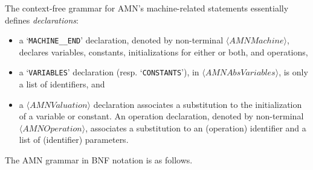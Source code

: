\documentclass[a4paper,openany]{book}
\newcommand{\BS}{\char`\\}
\begin{document}
The context-free grammar for AMN's machine-related statements
essentially defines \emph{declarations}:
\begin{itemize}
\item a `\texttt{MACHINE\_\_END}' declaration, denoted by non-terminal $\langle\mathit{AMNMachine}\rangle$, declares variables, constants, initializations for either or both, and operations,
\item a `\texttt{VARIABLES}' declaration (resp. `\texttt{CONSTANTS}'), in $\langle\mathit{AMNAbsVariables}\rangle$, is only a list of identifiers, and
\item a  $\langle\mathit{AMNValuation}\rangle$ declaration associates a substitution to the initialization of a variable or constant. An operation declaration, denoted by non-terminal $\langle\mathit{AMNOperation}\rangle$, associates a substitution to an (operation) identifier and a list of (identifier) parameters.
\end{itemize}
The AMN grammar in BNF notation is as follows.
%
%
%
\end{document}

